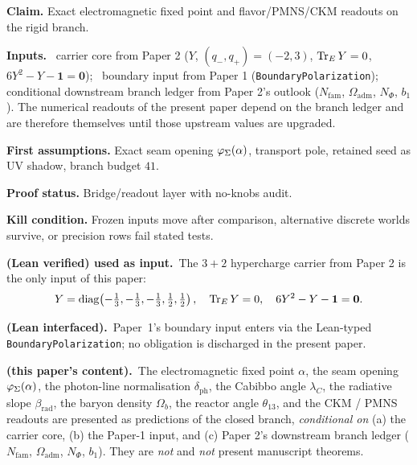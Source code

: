 \documentclass[11pt,a4paper]{article}
\begin{document}
\begin{tfptclaimcontract}
\textbf{Claim.} Exact electromagnetic fixed point and flavor/PMNS/CKM readouts on the rigid branch.\par
\textbf{Inputs.}\
 carrier core from Paper 2
($Y$, $(q_-,q_+)=(-2,3)$, $\operatorname{Tr}_E Y = 0$, $6Y^2-Y-\mathbf 1 = \mathbf 0$);\
 boundary input from Paper 1 (\texttt{BoundaryPolarization});\
 conditional downstream branch ledger from Paper 2's
 outlook ($N_{\mathrm{fam}}$, $\Omega_{\mathrm{adm}}$,
$N_\Phi$, $b_1$). The numerical readouts of the present paper
depend on the \stag{C} branch ledger and are therefore
themselves \stag{C} until those upstream values are upgraded.\par
\textbf{First assumptions.} Exact seam opening $\varphi_{\Sigma}(\alpha)$, transport pole, retained seed as UV shadow, branch budget $41$.\par
\textbf{Proof status.} Bridge/readout layer with no-knobs audit.\par
\textbf{Kill condition.} Frozen inputs move after comparison, alternative discrete worlds survive, or precision rows fail stated tests.\par
\end{tfptclaimcontract}

\begin{tfptstatusbox}
\textbf{ (Lean verified) used as input.}\ The $3+2$
hypercharge carrier from Paper 2 is the only  input of
this paper:
\[
Y = \operatorname{diag}\!\left(-\tfrac13,-\tfrac13,-\tfrac13,\tfrac12,\tfrac12\right),
\quad
\operatorname{Tr}_E Y = 0,
\quad
6 Y^2 - Y - \mathbf 1 = \mathbf 0.
\]

\smallskip
\textbf{ (Lean interfaced).}\ Paper~1's boundary input
enters via the Lean-typed \texttt{BoundaryPolarization}; no
\stag{I} obligation is discharged in the present paper.

\smallskip
\textbf{\stag{C} (this paper's content).}\ The electromagnetic
fixed point $\alpha$, the seam opening $\varphi_{\Sigma}(\alpha)$, the
photon-line normalisation $\delta_{\mathrm{ph}}$, the Cabibbo
angle $\lambda_C$, the radiative slope $\beta_{\mathrm{rad}}$,
the baryon density $\Omega_b$, the reactor angle $\theta_{13}$,
and the CKM / PMNS readouts are presented as predictions of
the closed branch, \emph{conditional on} (a) the 
carrier core, (b) the \stag{I} Paper-1 input, and (c) Paper 2's
\stag{C} downstream branch ledger
($N_{\mathrm{fam}}$, $\Omega_{\mathrm{adm}}$, $N_\Phi$, $b_1$).
They are \emph{not} \stag{L} and \emph{not} present manuscript
\stag{M} theorems.
\end{tfptstatusbox}
\end{document}
